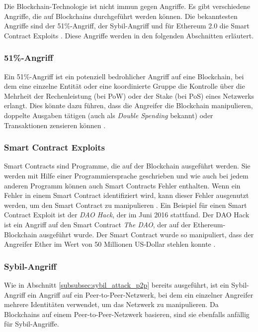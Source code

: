 Die Blockchain-Technologie ist nicht immun gegen Angriffe. Es gibt verschiedene Angriffe, die auf Blockchains durchgeführt werden können. Die bekanntesten Angriffe sind der 51\%-Angriff, der Sybil-Angriff und für Ethereum 2.0 die Smart Contract Exploits \Parencites[S. 95034]{Nam_51PercentAttacks}[S. 251]{Douceur_SybilAttack}. Diese Angriffe werden in den folgenden Abschnitten erläutert.

\subsubsection{51\%-Angriff}

Ein 51\%-Angriff ist ein potenziell bedrohlicher Angriff auf eine Blockchain, bei dem eine einzelne Entität oder eine koordinierte Gruppe die Kontrolle über die Mehrheit der Rechenleistung (bei PoW) oder der Stake (bei PoS) eines Netzwerks erlangt. Dies könnte dazu führen, dass die Angreifer die Blockchain manipulieren, doppelte Ausgaben tätigen (auch als \textit{Double Spending} bekannt) oder Transaktionen zensieren können \Parencites[S. 95034]{Nam_51PercentAttacks}[S. 2]{Rosenfeld_DoubleSpending}.

\subsubsection{Smart Contract Exploits}

Smart Contracts sind Programme, die auf der Blockchain ausgeführt werden. Sie werden mit Hilfe einer Programmiersprache geschrieben und wie auch bei jedem anderen Programm können auch Smart Contracts Fehler enthalten. Wenn ein Fehler in einem Smart Contract identifiziert wird, kann dieser Fehler ausgenutzt werden, um den Smart Contract zu manipulieren \Parencite[S. 1-2]{Perez_SmartContractVulnerabilities}. Ein Beispiel für einen Smart Contract Exploit ist der \textit{DAO Hack}, der im Juni 2016 stattfand. Der DAO Hack ist ein Angriff auf den Smart Contract \textit{The DAO}, der auf der Ethereum-Blockchain ausgeführt wurde. Der Smart Contract wurde so manipuliert, dass der Angreifer Ether im Wert von 50 Millionen US-Dollar stehlen konnte \Parencite{Pratap_DAOHack}.


\subsubsection{Sybil-Angriff}

Wie in Abschnitt \ref{subsubsec:sybil_attack_p2p} \textit{} bereits ausgeführt, ist ein Sybil-Angriff ein Angriff auf ein Peer-to-Peer-Netzwerk, bei dem ein einzelner Angreifer mehrere Identitäten verwendet, um das Netzwerk zu manipulieren. Da Blockchains auf einem Peer-to-Peer-Netzwerk basieren, sind sie ebenfalls anfällig für Sybil-Angriffe.  


